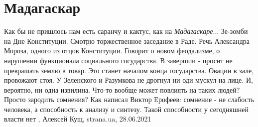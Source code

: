  
 
 
 
 
\chapter{Мадагаскар}

Как бы не пришлось нам есть саранчу и кактус, как на \emph{Мадагаскаре}...
Зе-зомби на Дне Конституции.  Смотрю торжественное заседание в Раде.  Речь
Александра Мороза, одного из отцов Конституции.  Говорит о новом феодализме, о
нарушении функционала социального государства.  В завершии - просит не
преврашать землю в товар. Это станет началом конца государства. Овации в зале,
провожают стоя.  У Зеленского и Разумкова не дрогнул ни оди мускул на лице. И,
вероятно, ни одна извилина.  Что-то вообще может повлиять на таких людей?
Просто зародить сомнения?  Как написал Виктор Ерофеев: сомнение - не слабость
человека, а способность к анализу и синтезу.  Такой способности у сегодняшней
власти нет
, 
Алексей Кущ, strana.ua, 28.06.2021


